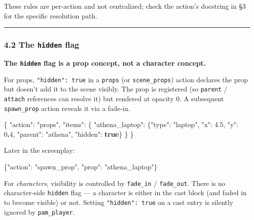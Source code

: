 \documentclass[
  11pt,
]{book}
\newenvironment{Shaded}{}{}
\newcommand{\DataTypeTok}[1]{\textcolor[rgb]{0.56,0.13,0.00}{#1}}
\newcommand{\DecValTok}[1]{\textcolor[rgb]{0.25,0.63,0.44}{#1}}
\newcommand{\ErrorTok}[1]{\textcolor[rgb]{1.00,0.00,0.00}{\textbf{#1}}}
\newcommand{\FloatTok}[1]{\textcolor[rgb]{0.25,0.63,0.44}{#1}}
\newcommand{\FunctionTok}[1]{\textcolor[rgb]{0.02,0.16,0.49}{#1}}
\newcommand{\KeywordTok}[1]{\textcolor[rgb]{0.00,0.44,0.13}{\textbf{#1}}}
\newcommand{\StringTok}[1]{\textcolor[rgb]{0.25,0.44,0.63}{#1}}
\begin{document}
These rules are per-action and not centralized; check the action's
docstring in §3 for the specific resolution path.

\begin{center}\rule{0.5\linewidth}{0.5pt}\end{center}

\subsubsection{\texorpdfstring{4.2 The \texttt{hidden}
flag}{4.2 The hidden flag}}\label{the-hidden-flag}

\textbf{The \texttt{hidden} flag is a prop concept, not a character
concept.}

For props, \texttt{"hidden":\ true} in a \texttt{props} (or
\texttt{scene\_props}) action declares the prop but doesn't add it to
the scene visibly. The prop is registered (so \texttt{parent} /
\texttt{attach} references can resolve it) but rendered at opacity 0. A
subsequent \texttt{spawn\_prop} action reveals it via a fade-in.

\begin{Shaded}
\begin{Highlighting}[]
\FunctionTok{\{}
  \DataTypeTok{"action"}\FunctionTok{:} \StringTok{"props"}\FunctionTok{,}
  \DataTypeTok{"items"}\FunctionTok{:} \FunctionTok{\{}
    \DataTypeTok{"athena\_laptop"}\FunctionTok{:} \FunctionTok{\{}\DataTypeTok{"type"}\FunctionTok{:} \StringTok{"laptop"}\FunctionTok{,} \DataTypeTok{"x"}\FunctionTok{:} \FloatTok{4.5}\FunctionTok{,} \DataTypeTok{"y"}\FunctionTok{:} \DecValTok{0}\ErrorTok{.}\DecValTok{4}\FunctionTok{,}
                      \DataTypeTok{"parent"}\FunctionTok{:} \StringTok{"athena"}\FunctionTok{,} \DataTypeTok{"hidden"}\FunctionTok{:} \KeywordTok{true}\FunctionTok{\}}
  \FunctionTok{\}}
\FunctionTok{\}}
\end{Highlighting}
\end{Shaded}

Later in the screenplay:

\begin{Shaded}
\begin{Highlighting}[]
\FunctionTok{\{}\DataTypeTok{"action"}\FunctionTok{:} \StringTok{"spawn\_prop"}\FunctionTok{,} \DataTypeTok{"prop"}\FunctionTok{:} \StringTok{"athena\_laptop"}\FunctionTok{\}}
\end{Highlighting}
\end{Shaded}

For \emph{characters}, visibility is controlled by \texttt{fade\_in} /
\texttt{fade\_out}. There is no character-side \texttt{hidden} flag ---
a character is either in the cast block (and faded in to become visible)
or not. Setting \texttt{"hidden":\ true} on a cast entry is silently
ignored by \texttt{pam\_player}.
\end{document}

